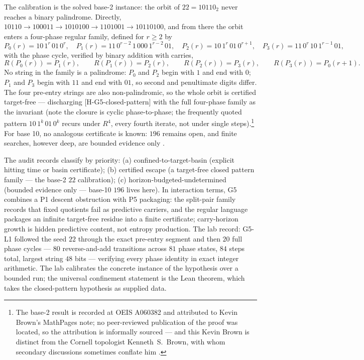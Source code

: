 \documentclass[11pt]{article}
\theoremstyle{definition}
\begin{document}
The calibration is the solved base-2 instance: the orbit of $22 = 10110_2$ never reaches a binary
palindrome. Directly, $10110 \to 100011 \to 1010100 \to 1101001 \to 10110100$, and from there the
orbit enters a four-phase regular family, defined for $r \ge 2$ by
\[
  P_0(r) = 10\,1^r\,01\,0^r, \quad
  P_1(r) = 11\,0^{r-2}\,1\,000\,1^{r-2}\,01, \quad
  P_2(r) = 10\,1^r\,01\,0^{r+1}, \quad
  P_3(r) = 11\,0^r\,10\,1^{r-1}\,01,
\]
with the phase cycle, verified by binary addition with carries,
\[
  R(P_0(r)) = P_1(r), \qquad
  R(P_1(r)) = P_2(r), \qquad
  R(P_2(r)) = P_3(r), \qquad
  R(P_3(r)) = P_0(r+1).
\]
No string in the family is a palindrome: $P_0$ and $P_2$ begin with $1$ and end with $0$; $P_1$ and
$P_3$ begin with $11$ and end with $01$, so second and penultimate digits differ. The four pre-entry
strings are also non-palindromic, so the whole orbit is certified target-free --- discharging
\textup{[H-G5-closed-pattern]} with the full four-phase family as the invariant (note the closure is
cyclic phase-to-phase; the frequently quoted pattern $10\,1^k\,01\,0^k$ recurs under $R^4$, every
fourth iterate, not under single steps).\footnote{The base-2 result is recorded at OEIS A060382 and
attributed to Kevin Brown's MathPages note; no peer-reviewed publication of the proof was located, so
the attribution is informally sourced --- and this Kevin Brown is distinct from the Cornell
topologist Kenneth~S.~Brown, with whom secondary discussions sometimes conflate him
\citep{OEIS-A060382,Brown-MathPages}.} For base 10, no analogous certificate is known: $196$ remains
open, and finite searches, however deep, are bounded evidence only \citep{Walker-Fourmilab}.

The audit records classify by priority: (a) confined-to-target-basin (explicit hitting time or basin
certificate); (b) certified escape (a target-free closed pattern family --- the base-2 $22$
calibration); (c) horizon-budgeted-undetermined (bounded evidence only --- base-10 $196$ lives
here). In interaction terms, G5 combines a P1 descent obstruction with P5 packaging: the split-pair
family records that fixed quotients fail as predictive carriers, and the regular language packages an
infinite target-free residue into a finite certificate; carry-horizon growth is hidden predictive
content, not entropy production. The lab record: G5-L1 followed the seed $22$ through the exact
pre-entry segment and then $20$ full phase cycles --- $80$ reverse-and-add transitions across $81$
phase states, $84$ steps total, largest string $48$ bits --- verifying every phase identity in exact
integer arithmetic. The lab calibrates the concrete instance of the hypothesis over a bounded run;
the universal confinement statement is the Lean theorem, which takes the closed-pattern hypothesis as
supplied data.
\end{document}
